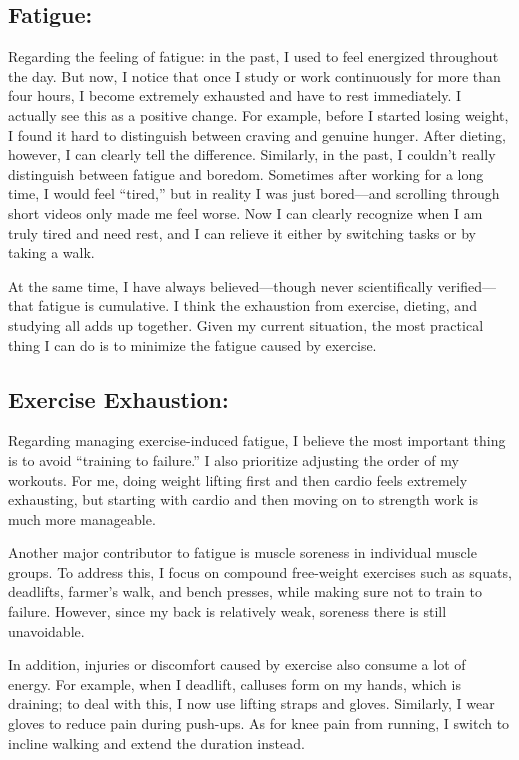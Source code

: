 \subsection{Fatigue:}
Regarding the feeling of fatigue: in the past, I used to feel energized throughout the day. But now, I notice that once I study or work continuously for more than four hours, I become extremely exhausted and have to rest immediately. I actually see this as a positive change. For example, before I started losing weight, I found it hard to distinguish between craving and genuine hunger. After dieting, however, I can clearly tell the difference. Similarly, in the past, I couldn’t really distinguish between fatigue and boredom. Sometimes after working for a long time, I would feel “tired,” but in reality I was just bored—and scrolling through short videos only made me feel worse. Now I can clearly recognize when I am truly tired and need rest, and I can relieve it either by switching tasks or by taking a walk.

At the same time, I have always believed—though never scientifically verified—that fatigue is cumulative. I think the exhaustion from exercise, dieting, and studying all adds up together. Given my current situation, the most practical thing I can do is to minimize the fatigue caused by exercise.

\subsection{Exercise Exhaustion:}
Regarding managing exercise-induced fatigue, I believe the most important thing is to avoid “training to failure.” I also prioritize adjusting the order of my workouts. For me, doing weight lifting first and then cardio feels extremely exhausting, but starting with cardio and then moving on to strength work is much more manageable.

Another major contributor to fatigue is muscle soreness in individual muscle groups. To address this, I focus on compound free-weight exercises such as squats, deadlifts, farmer’s walk, and bench presses, while making sure not to train to failure. However, since my back is relatively weak, soreness there is still unavoidable.

In addition, injuries or discomfort caused by exercise also consume a lot of energy. For example, when I deadlift, calluses form on my hands, which is draining; to deal with this, I now use lifting straps and gloves. Similarly, I wear gloves to reduce pain during push-ups. As for knee pain from running, I switch to incline walking and extend the duration instead.

